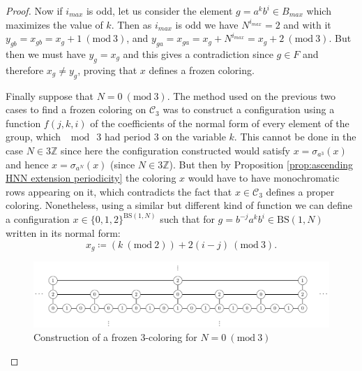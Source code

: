 \documentclass[cupthm,crop,info]{CUP-JNL-ETS}%
\theoremstyle{cupplain}
\theoremstyle{cupdefinition}
\theoremstyle{cupremark}
\theoremstyle{cupproof}
\newtheorem{proof}{Proof}
\numberwithin{equation}{section}
\newcommand{\BS}[1][N]{\mathrm{BS}(1,#1)}
\begin{document}
\begin{proof}
	Now if $i_{max}$ is odd, let us consider the element $g=a^kb^i\in B_{max}$ which maximizes the value of $k$. Then as $i_{max}$ is odd we have $N^{i_{max}}=2$ and with it $y_{gb}=x_{gb}=x_g+1  \ (\mathrm{mod} \ 3)$, and $y_{ga}=x_{ga}=x_g+N^{i_{max}} = x_g+2  \ (\mathrm{mod} \ 3)$. But then we must have $y_g=x_g$ and this gives a contradiction since $g\in F$ and therefore $x_g\neq y_g$, proving that $x$ defines a frozen coloring.
	
	
	Finally suppose that $N=0 \ (\mathrm{mod} \ 3)$. The method used on the previous two cases to find a frozen coloring on $\mathcal{C}_3$ was to construct a configuration using a function $f(j,k,i)$ of the coefficients of the normal form of every element of the group, which $\mod \ 3$ had period $3$ on the variable $k$. This cannot be done in the case $N\in 3\mathbb{Z }$ since here the configuration constructed would satisfy $x=\sigma_{a^3}(x)$ and hence $x=\sigma_{a^N}(x)$ (since $N\in 3\mathbb{Z}$). But then by Proposition \ref{prop:ascending HNN extension periodicity} the coloring $x$ would have to have monochromatic rows appearing on it, which contradicts the fact that $x\in \mathcal{C}_3$ defines a proper coloring. Nonetheless, using a similar but different kind of function we can define a configuration $x\in \{0,1,2\}^{\BS}$ such that for $g=b^{-j}a^k b^i\in \BS$ written in its normal form:
	$$
	x_g\coloneqq (k \ (\mathrm{mod} \ 2)) + 2(i-j) \ (\mathrm{mod} \ 3).
	$$
	
	\begin{figure}
		\centering
\includegraphics[scale=0.6]{frozen3_n0mod3.pdf}
		\caption{Construction of a frozen $3$-coloring for $N=0\ (\mathrm{mod} \ 3)$}
		\label{fig:gcs_frozen_3_col_N_0}
	\end{figure}
	
	
	

\end{proof}
\end{document}
